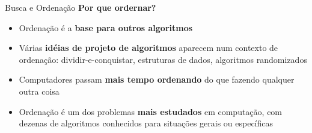 \documentclass[10pt]{beamer}
\begin{document}
\begin{frame}{Busca e Ordenação}
  \huge
  \textbf{Por que ordernar?}
  \vfill
  \large
  \begin{itemize}
    \item Ordenação é a \textbf{base para outros algoritmos}
    \item Várias \textbf{idéias de projeto de algoritmos} aparecem num contexto de ordenação: dividir-e-conquistar, estruturas de dados, algoritmos randomizados
    \item Computadores passam \textbf{mais tempo ordenando} do que fazendo qualquer outra coisa
    \item Ordenação é um dos problemas \textbf{mais estudados} em computação, com dezenas de algoritmos conhecidos para situações gerais ou específicas
  \end{itemize}
\end{frame}
\end{document}
